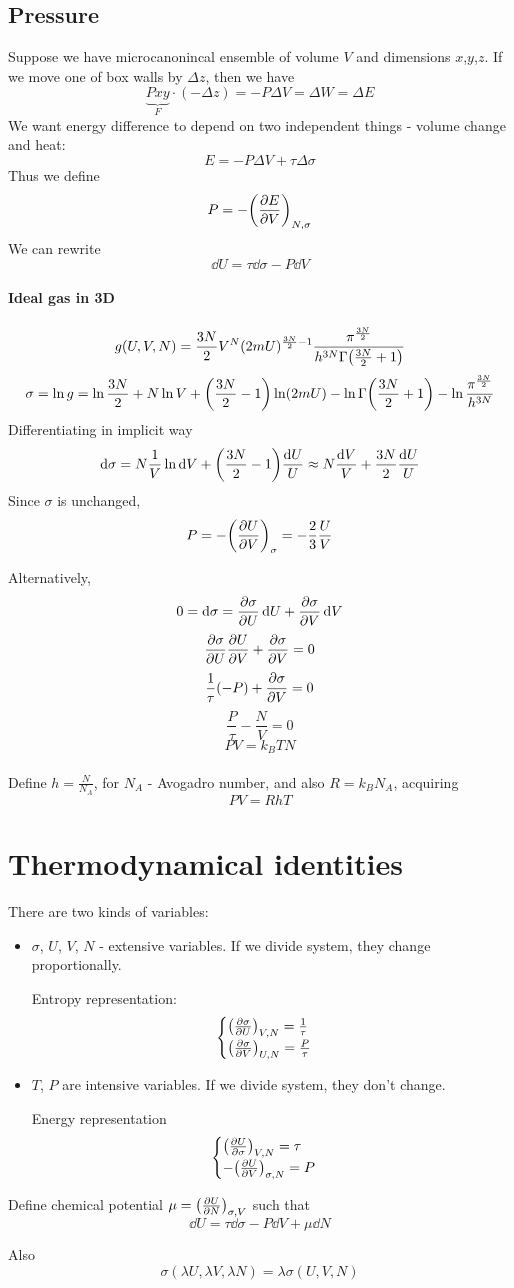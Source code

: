 \subsection{Pressure}
Suppose we have microcanonincal ensemble of volume $V$ and dimensions $x$,$y$,$z$. If we move one of box walls by $\Delta z$, then we have
$$\underbrace{Pxy}_{F} \cdot (-\Delta z )= -P \Delta V  =\Delta W = \Delta E$$
We want energy difference to depend on two independent things - volume change and heat:
$$E = -P\Delta V + \tau \Delta \sigma$$
Thus we define
$$ P = - \qty(\pdv{E}{V})_{N, \sigma}$$ 
We can rewrite
$$\dd{U} = \tau\dd{\sigma} - P\dd{V}$$
\paragraph{Ideal gas in 3D}
$$g(U,V,N) = \frac{3N}{2} V^N (2mU)^{\frac{3N}{2}-1} \frac{\pi^{\frac{3N}{2}}}{h^{3N} \Gamma\qty(\frac{3N}{2}+1)} $$
$$\sigma = \ln g = \ln \frac{3N}{2} + N\ln V + \qty(\frac{3N}{2}-1)\ln (2mU) - \ln \Gamma\qty(\frac{3N}{2}+1) - \ln \frac{\pi^{\frac{3N}{2}}}{h^{3N}}$$
Differentiating in implicit way
$$\dd{\sigma} = N \frac{1}{V} \ln \dd{V} +  \qty(\frac{3N}{2}-1)\frac{\dd{U}}{U} \approx N\frac{\dd{V}}{V} + \frac{3N}{2}\frac{\dd{U}}{U}$$
Since $\sigma$ is unchanged,
$$P = -\qty(\pdv{U}{V})_{\sigma} = -\frac{2}{3}\frac{U}{V}$$


Alternatively,
$$0 =\dd{\sigma} = \pdv{\sigma}{U}\dd{U} + \pdv{\sigma}{V} \dd{V}$$
$$\pdv{\sigma}{U} \pdv{U}{V} + \pdv{\sigma}{V} = 0$$
$$\frac{1}{\tau} (-P) + \pdv{\sigma}{V} = 0$$
$$\frac{P}{\tau} - \frac{N}{V} = 0$$
$$PV = k_B TN$$

\paragraph{}
Define $h = \frac{N}{N_A}$, for $N_A$ - Avogadro number, and also $R  = k_B N_A$, acquiring
$$PV = RhT$$
\section{Thermodynamical identities}
There are two kinds of variables: 
\begin{itemize}
	\item $\sigma$, $U$, $V$, $N$ - extensive variables. If we divide system, they change proportionally.
	
	Entropy representation:
	$$\begin{cases}
	\qty(\pdv{\sigma}{U})_{V,N} = \frac{1}{\tau}\\
	\qty(\pdv{\sigma}{V})_{U,N} = \frac{P}{\tau}
	\end{cases}$$
	\item $T$, $P$ are intensive variables. If we divide system, they don't change.
	
	Energy representation
	$$\begin{cases}
	\qty(\pdv{U}{\sigma})_{V, N} = \tau\\
	-\qty(\pdv{U}{V})_{\sigma, N} = P
	\end{cases}$$
\end{itemize}

Define chemical potential $\mu=\qty(\pdv{U}{N})_{\sigma, V}$ such that
$$\dd{U} = \tau \dd{\sigma} - P \dd{V} + \mu\dd{N}$$

Also
$$\sigma(\lambda U, \lambda V, \lambda N) = \lambda \sigma ( U,  V,  N) $$